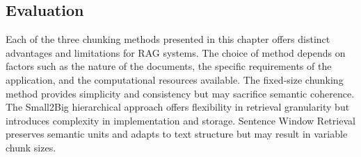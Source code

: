 \subsection{Evaluation}\label{subsec:evaluation}
Each of the three chunking methods presented in this chapter offers distinct advantages and limitations for RAG systems. 
The choice of method depends on factors such as the nature of the documents, the specific requirements of the application, and the computational resources available.
The fixed-size chunking method provides simplicity and consistency but may sacrifice semantic coherence. 
The Small2Big hierarchical approach offers flexibility in retrieval granularity but introduces complexity in implementation and storage. 
Sentence Window Retrieval preserves semantic units and adapts to text structure but may result in variable chunk sizes.
\begin{table}[h!]
    \noindent
    \caption{Evaluation Results for Different Embeddings Models through the Pipeline (just with the Gemma2 model)}
    \label{tab:table_chunking}
\end{table}

